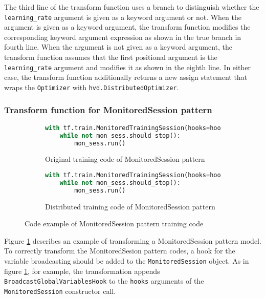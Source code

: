 The third line of the transform function uses a branch to distinguish 
whether the {\tt learning\_rate} argument is given as a keyword argument or not. 
When the argument is given as a keyword argument,
the transform function modifies the corresponding keyword argument expression
as shown in the true branch in fourth line.
When the argument is not given as a keyword argument,
the transform function assumes that the first positional argument
is the {\tt learning\_rate} argument and modifies it
as shown in the eighth line.
In either case, the transform function additionally returns a new
assign statement that wraps the {\tt Optimizer} with
{\tt hvd.DistributedOptimizer}.

\pagebreak

\subsubsection{Transform function for MonitoredSession pattern}

\begin{figure}[ht!]
  \centering
  \begin{subfigure}[t]{0.45\textwidth}
    \begin{lstlisting}[language=Python]
with tf.train.MonitoredTrainingSession(hooks=hooks) as mon_sess:
    while not mon_sess.should_stop():
        mon_sess.run()
    \end{lstlisting}
    \caption{Original training code of MonitoredSession pattern}
  \end{subfigure}
  \hspace{5mm}
  \begin{subfigure}[t]{0.45\textwidth}
    \begin{lstlisting}[language=Python]
with tf.train.MonitoredTrainingSession(hooks=hooks.append(hvd.BroadcastGlobalVariablesHook(0)) as mon_sess:
    while not mon_sess.should_stop():
        mon_sess.run()
    \end{lstlisting}
    \caption{Distributed training code of MonitoredSession pattern}
  \end{subfigure}
  \caption{Code example of MonitoredSession pattern training code}
  \label{fig:trans:monsesstrans}
\end{figure}


Figure \ref{fig:trans:monsesstrans} describes an example of transforming
a MonitoredSession pattern model.
To correctly transform the MonitoredSesion pattern codes,
a hook for the variable broadcasting should be added to the
{\tt MonitoredSession} object. 
As in figure \ref{fig:trans:monsesstrans}, for example,
the transformation appends {\tt BroadcastGlobalVariablesHook} to the
{\tt hooks} arguments of the {\tt MonitoredSession} constructor call.

